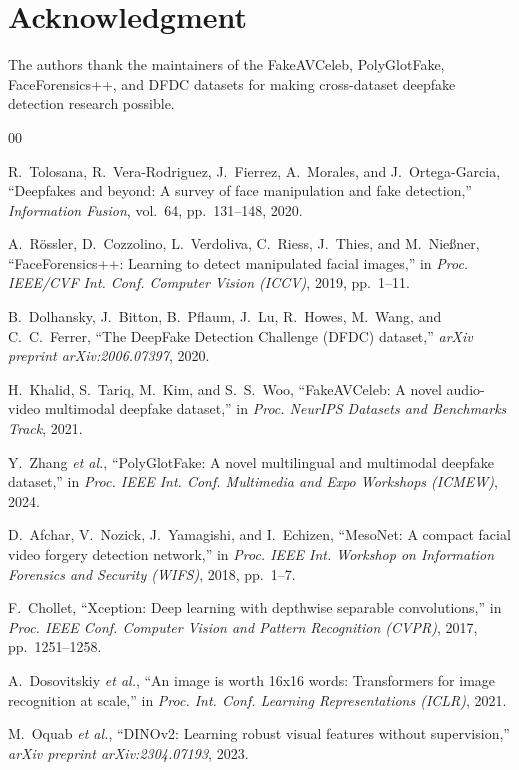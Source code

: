 \documentclass[conference]{IEEEtran}
\begin{document}
\section*{Acknowledgment}
The authors thank the maintainers of the FakeAVCeleb, PolyGlotFake,
FaceForensics++, and DFDC datasets for making cross-dataset deepfake
detection research possible.

\begin{thebibliography}{00}

R.~Tolosana, R.~Vera-Rodriguez, J.~Fierrez, A.~Morales, and J.~Ortega-Garcia,
``Deepfakes and beyond: A survey of face manipulation and fake detection,''
\emph{Information Fusion}, vol.~64, pp.~131--148, 2020.

A.~R\"{o}ssler, D.~Cozzolino, L.~Verdoliva, C.~Riess, J.~Thies, and
M.~Nie\ss{}ner, ``FaceForensics++: Learning to detect manipulated facial
images,'' in \emph{Proc. IEEE/CVF Int. Conf. Computer Vision (ICCV)}, 2019,
pp.~1--11.

B.~Dolhansky, J.~Bitton, B.~Pflaum, J.~Lu, R.~Howes, M.~Wang, and
C.~C.~Ferrer, ``The DeepFake Detection Challenge (DFDC) dataset,''
\emph{arXiv preprint arXiv:2006.07397}, 2020.

H.~Khalid, S.~Tariq, M.~Kim, and S.~S.~Woo, ``FakeAVCeleb: A novel
audio-video multimodal deepfake dataset,'' in \emph{Proc. NeurIPS Datasets
and Benchmarks Track}, 2021.

Y.~Zhang \emph{et al.}, ``PolyGlotFake: A novel multilingual and multimodal
deepfake dataset,'' in \emph{Proc. IEEE Int. Conf. Multimedia and Expo
Workshops (ICMEW)}, 2024.

D.~Afchar, V.~Nozick, J.~Yamagishi, and I.~Echizen, ``MesoNet: A compact
facial video forgery detection network,'' in \emph{Proc. IEEE Int.
Workshop on Information Forensics and Security (WIFS)}, 2018, pp.~1--7.

F.~Chollet, ``Xception: Deep learning with depthwise separable
convolutions,'' in \emph{Proc. IEEE Conf. Computer Vision and Pattern
Recognition (CVPR)}, 2017, pp.~1251--1258.

A.~Dosovitskiy \emph{et al.}, ``An image is worth 16x16 words: Transformers
for image recognition at scale,'' in \emph{Proc. Int. Conf. Learning
Representations (ICLR)}, 2021.

M.~Oquab \emph{et al.}, ``DINOv2: Learning robust visual features without
supervision,'' \emph{arXiv preprint arXiv:2304.07193}, 2023.


\end{thebibliography}
\end{document}
